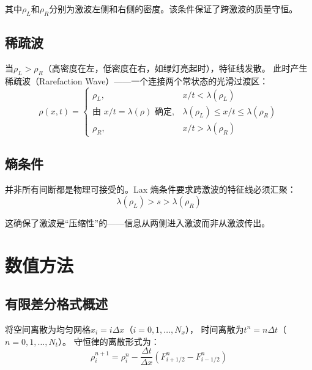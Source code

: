 \documentclass[12pt,a4paper]{ctexart}
\begin{document}
其中$\rho_L$和$\rho_R$分别为激波左侧和右侧的密度。该条件保证了跨激波的质量守恒。

\subsection{稀疏波}

当$\rho_L > \rho_R$（高密度在左，低密度在右，如绿灯亮起时），特征线发散。
此时产生稀疏波（Rarefaction Wave）——一个连接两个常状态的光滑过渡区：
\begin{equation}
    \rho(x, t) = \begin{cases}
        \rho_L, & x/t < \lambda(\rho_L) \\
        \text{由 } x/t = \lambda(\rho) \text{ 确定}, & \lambda(\rho_L) \le x/t \le \lambda(\rho_R) \\
        \rho_R, & x/t > \lambda(\rho_R)
    \end{cases}
\end{equation}

\subsection{熵条件}

并非所有间断都是物理可接受的。Lax 熵条件要求跨激波的特征线必须汇聚：
\begin{equation}
    \lambda(\rho_L) > s > \lambda(\rho_R)
    \label{eq:entropy}
\end{equation}

这确保了激波是``压缩性''的——信息从两侧进入激波而非从激波传出。

\newpage

\section{数值方法}

\subsection{有限差分格式概述}

将空间离散为均匀网格$x_i = i\Delta x$（$i = 0, 1, \ldots, N_x$），
时间离散为$t^n = n\Delta t$（$n = 0, 1, \ldots, N_t$）。
守恒律的离散形式为：
\begin{equation}
    \rho_i^{n+1} = \rho_i^n - \frac{\Delta t}{\Delta x}\left(F_{i+1/2}^n - F_{i-1/2}^n\right)
    \label{eq:conservative}
\end{equation}
\end{document}

